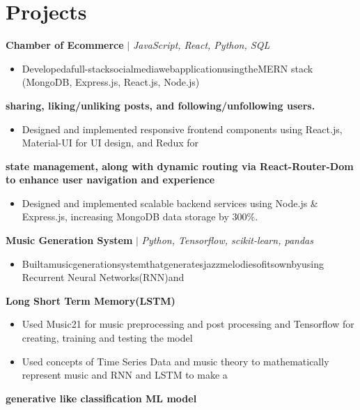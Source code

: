 \documentclass[letterpaper,10pt]{article}
\begin{document}
\section{Projects}
\textbf{Chamber of Ecommerce}
 $|$ \textit{JavaScript, React, Python, SQL}\begin{itemize}
  \item Developedafull-stacksocialmediawebapplicationusingtheMERN stack (MongoDB, Express.js, React.js, Node.js)
\end{itemize}
\textbf{sharing, liking/unliking posts, and following/unfollowing users.}
\begin{itemize}
  \item Designed and implemented responsive frontend components using React.js, Material-UI for UI design, and Redux for
\end{itemize}
\textbf{state management, along with dynamic routing via React-Router-Dom to enhance user navigation and experience}
\begin{itemize}
  \item Designed and implemented scalable backend services using Node.js \& Express.js, increasing MongoDB data storage by 300\%.
\end{itemize}
\textbf{Music Generation System}
 $|$ \textit{Python, Tensorflow, scikit-learn, pandas}\begin{itemize}
  \item Builtamusicgenerationsystemthatgeneratesjazzmelodiesofitsownbyusing Recurrent Neural Networks(RNN)and
\end{itemize}
\textbf{Long Short Term Memory(LSTM)}
\begin{itemize}
  \item Used Music21 for music preprocessing and post processing and Tensorflow for creating, training and testing the model
  \item Used concepts of Time Series Data and music theory to mathematically represent music and RNN and LSTM to make a
\end{itemize}
\textbf{generative like classification ML model}
\end{document}
